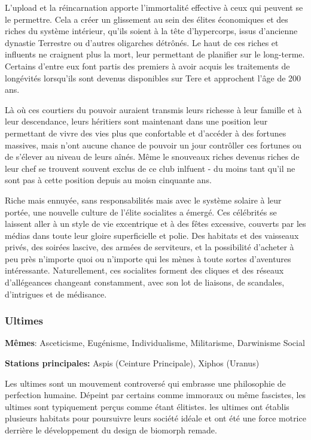 L'upload et la réincarnation apporte l'immortalité effective à ceux qui peuvent se le permettre. Cela a créer un glissement au sein des élites économiques et des riches du système intérieur, qu'ils soient à la tête d'hypercorps, issus d'ancienne dynastie Terrestre ou d'autres oligarches détrônés. Le haut de ces riches et influents ne craignent plus la mort, leur permettant de planifier sur le long-terme. Certains d'entre eux font partis des premiers à avoir acquis les traitements de longévités lorsqu'ils sont devenus disponibles sur Tere et approchent l'âge de 200 ans. 

Là où ces courtiers du pouvoir auraient transmis leurs richesse à leur famille et à leur descendance, leurs héritiers sont maintenant dans une position leur permettant de vivre des vies plus que confortable et d'accéder à des fortunes massives, mais n'ont aucune chance de pouvoir un jour contrôller ces fortunes ou de s'élever au niveau de leurs aînés. Même le snouveaux riches devenus riches de leur chef se trouvent souvent exclus de ce club inlfuent - du moins tant qu'il ne sont pas à cette position depuis au moisn cinquante ans. 

Riche mais ennuyée, sans responsabilités mais avec le système solaire à leur portée, une nouvelle culture de l'élite socialites a émergé. Ces célébrités se laissent aller à un style de vie excentrique et à des fêtes excessive, couverts par les médias dans toute leur gloire superficielle et polie. Des habitats et des vaisseaux privés, des soirées lascive, des armées de serviteurs, et la possibilité d'acheter à peu près n'importe quoi ou n'importe qui les mènes à toute sortes d'aventures intéressante. Naturellement, ces socialites forment des cliques et des réseaux d'allégeances changeant constamment, avec son lot de liaisons, de scandales, d'intrigues et de médisance. 

\subsubsection{Ultimes} \label{sec:ultimates} 

\textbf{Mêmes}: Asceticisme, Eugénisme, Individualisme, Militarisme, Darwinisme Social 

\textbf{Stations principales:} Aspis (Ceinture Principale), Xiphos (Uranus) 

Les ultimes sont un mouvement controversé qui embrasse une philosophie de perfection humaine. Dépeint par certains comme immoraux ou même fascistes, les ultimes sont typiquement perçus comme étant élitistes. les ultimes ont établis plusieurs habitats pour poursuivre leurs société idéale et ont été une force motrice derrière le développement du design de biomorph remade. 

